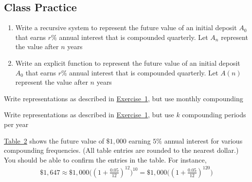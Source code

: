 \documentclass[10pt,]{book}
\theoremstyle{ptxdefinitionnotitle}
\theoremstyle{ptxdefinitiontitle}
\theoremstyle{ptxdefinitionnotitle}
\theoremstyle{ptxdefinitiontitle}
\theoremstyle{ptxdefinitionnotitle}
\theoremstyle{ptxdefinitiontitle}
\numberwithin{equation}{section}
\begin{document}
\subsection[{Class Practice}]{Class Practice}\label{exercises-7}
\begin{divisionexercise}{1}\hypertarget{chapter04-section05-classpractice-recursive-vs-explicit}{}
\leavevmode%
\begin{enumerate}[label=(\alph*)]
\item\hypertarget{li-105}{}Write a recursive system to represent the future value of an initial deposit \(A_0\) that earns \(r\%\) annual interest that is compounded quarterly. Let \(A_n\) represent the value after \(n\) years%
\item\hypertarget{li-106}{}Write an explicit function to represent the future value of an initial deposit \(A_0\) that earns \(r\%\) annual interest that is compounded quarterly. Let \(A(n)\) represent the value after \(n\) years%
\end{enumerate}
\end{divisionexercise}%
\begin{divisionexercise}{2}\hypertarget{exercise-48}{}
\hypertarget{p-206}{}%
Write representations as described in \hyperlink{chapter04-section05-classpractice-recursive-vs-explicit}{Exercise~1}, but use monthly compounding%
\end{divisionexercise}%
\begin{divisionexercise}{3}\hypertarget{exercise-49}{}
\hypertarget{p-207}{}%
Write representations as described in \hyperlink{chapter04-section05-classpractice-recursive-vs-explicit}{Exercise~1}, but use \(k\) compounding periods per year%
\end{divisionexercise}%
\hypertarget{p-208}{}%
\hyperref[impact-of-compounding-table]{Table~2} shows the future value of \(\$1,000\) earning \(5\%\) annual interest for various compounding frequencies. (All table entries are rounded to the nearest dollar.) You should be able to confirm the entries in the table.  For instance,%
%
\begin{gather*}
\$1,647 \approx \$1,000 \bigg( ( 1 + \frac{0.05}{12}) ^{12} \bigg)^{10} = \$1,000 \bigg( ( 1 + \frac{0.05}{12})^{120}\bigg)
\end{gather*}
\end{document}
